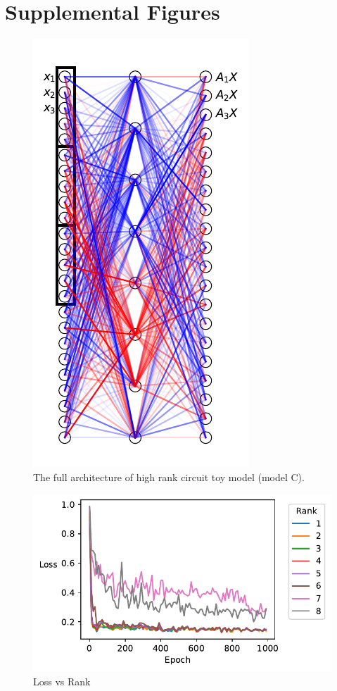 \documentclass{article}
\theoremstyle{plain}
\theoremstyle{definition}
\theoremstyle{remark}
\begin{document}
\section{Supplemental Figures}


\begin{figure}[ht]
    \centerline{\includegraphics{../figures/s1_high_rank_circuit_setup.pdf}}
    \centering
    \caption{The full architecture of high rank circuit toy model (model C).}\label{fig:s1_high_rank_circuit_setup}
\end{figure}


\begin{figure}[ht]
    \centerline{\includegraphics{../figures/s5_high_rank_circuits_loss_vs_rank.pdf}}
    \centering
    \caption{Loss vs Rank}\label{fig:s5_high_rank_circuits_loss_vs_rank}
\end{figure}
  
\end{document}
